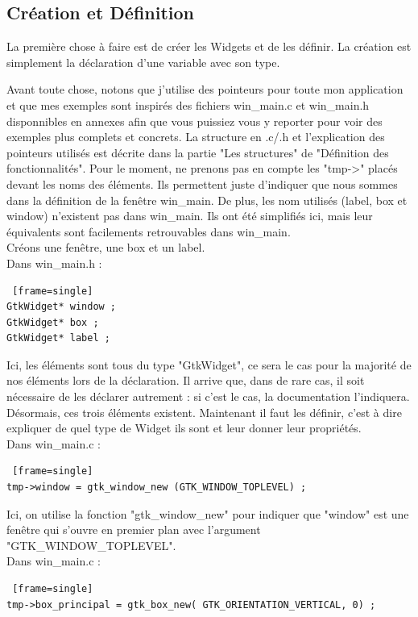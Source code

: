\documentclass[11pt,french,a4paper]{report}
\begin{document}
        \subsection{Création et Définition}
La première chose à faire est de créer les Widgets et de les définir. La création est simplement la déclaration d'une variable 
avec son type. 

Avant toute chose, notons que j'utilise des pointeurs pour toute mon application et que mes exemples 
sont inspirés des fichiers win\_main.c et win\_main.h disponnibles en annexes 
afin que vous puissiez vous y reporter pour voir des exemples plus complets et concrets. 
La structure en .c/.h et l'explication des pointeurs utilisés est décrite dans la partie "Les structures" de 
"Définition des fonctionnalités". Pour le moment, ne prenons pas en compte les "tmp->" placés devant les noms des éléments.
Ils permettent juste d'indiquer que nous sommes dans la définition de la fenêtre win\_main.
De plus, les nom utilisés (label, box et window) n'existent pas dans win\_main. Ils ont été simplifiés ici, 
mais leur équivalents sont facilements retrouvables dans win\_main.\\
Créons une fenêtre, une box et un label.\\
\small Dans win\_main.h : 
\begin{lstlisting} [frame=single]
GtkWidget* window ; 
GtkWidget* box ;   
GtkWidget* label ;  
\end{lstlisting}
Ici, les éléments sont tous du type "GtkWidget", ce sera le cas pour la majorité de nos éléments lors de la 
déclaration.
Il arrive que, dans de rare cas, il soit nécessaire de les déclarer autrement : si c'est le cas, la documentation l'indiquera. \\ 
Désormais, ces trois éléments existent. Maintenant il faut les définir, c'est à dire expliquer de quel type de Widget ils sont 
et leur donner leur propriétés. \\
\small Dans win\_main.c :
\begin{lstlisting} [frame=single]
tmp->window = gtk_window_new (GTK_WINDOW_TOPLEVEL) ;
\end{lstlisting}
Ici, on utilise la fonction "gtk\_window\_new" pour indiquer que "window" est une fenêtre qui s'ouvre en premier plan 
avec l'argument "GTK\_WINDOW\_TOPLEVEL". \\
\small Dans win\_main.c :
\begin{lstlisting} [frame=single]
tmp->box_principal = gtk_box_new( GTK_ORIENTATION_VERTICAL, 0) ;
\end{lstlisting}
\end{document}
